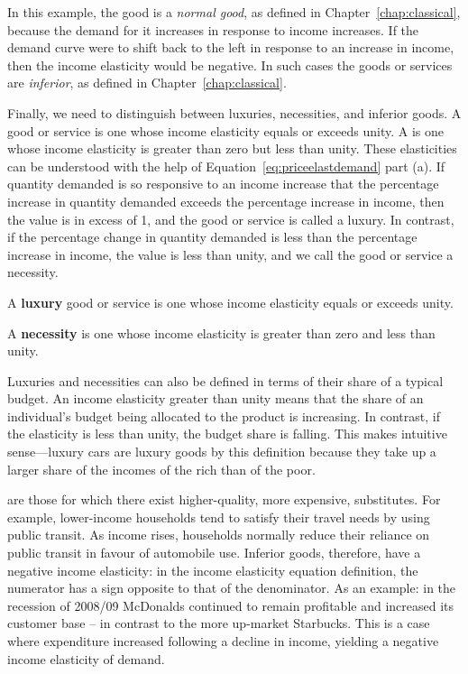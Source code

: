 

In this example, the good is a \textit{normal good}, as defined in Chapter~\ref{chap:classical}, because the demand for it increases in response to income increases. If the demand curve were to shift back to the left in response to an increase in income, then the income elasticity would be negative. In such cases the goods or services are \textit{inferior}, as defined in Chapter~\ref{chap:classical}.

Finally, we need to distinguish between luxuries, necessities, and inferior goods. A  good or service is one whose income elasticity equals or exceeds unity. A  is one whose income elasticity is greater than zero but less than unity. These elasticities can be understood with the help of Equation~\ref{eq:priceelastdemand} part (a). If quantity demanded is so responsive to an income increase that the percentage increase in quantity demanded exceeds the percentage increase in
income, then the value is in excess of 1, and the good or service is called a luxury. In contrast, if the percentage change in quantity demanded is less than the percentage increase in income, the value is less than unity, and we call the good or service a necessity.

\begin{DefBox}
A \textbf{luxury} good or service is one whose income elasticity equals or exceeds unity.
	
A \textbf{necessity} is one whose income elasticity is greater than zero and less than unity.
\end{DefBox}

Luxuries and necessities can also be defined in terms of their share of a typical budget. An income elasticity greater than unity means that the share of an individual's budget being allocated to the product is increasing. In contrast, if the elasticity is less than unity, the budget share is falling. This makes intuitive sense---luxury cars are luxury goods by this definition because they take up a larger share of the incomes of the rich than of the poor.

 are those for which there exist higher-quality, more expensive, substitutes. For example, lower-income households tend to satisfy their travel needs by using public transit. As income rises, households normally reduce their reliance on public transit in favour of automobile use. Inferior goods, therefore, have a negative income elasticity: in the income elasticity equation definition, the numerator has a sign opposite to that of the denominator. As an example: in the recession of 2008/09 McDonalds continued to remain profitable and increased its customer base -- in contrast to the more up-market Starbucks. This is a case where expenditure increased following a decline in income, yielding a negative income elasticity of demand.

